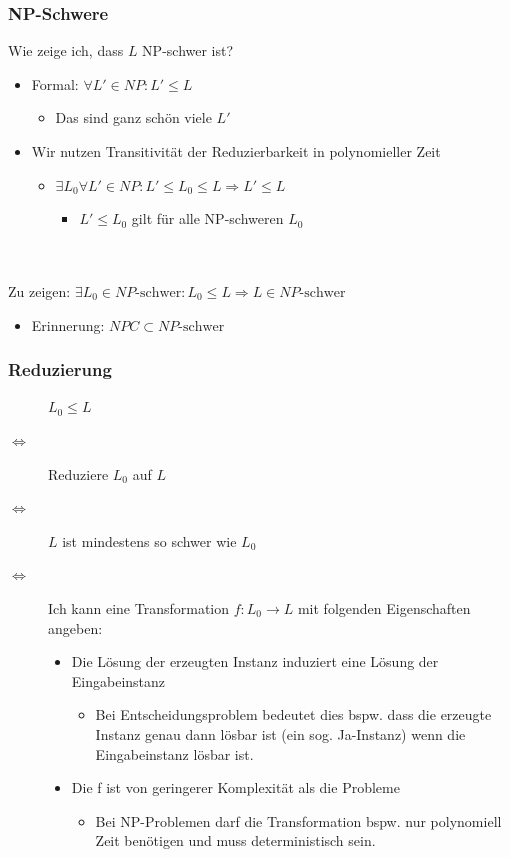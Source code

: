 \begin{frame}
	\frametitle{NP-Schwere}
	Wie zeige ich, dass $L$ NP-schwer ist?
	\begin{itemize}
		\item Formal: $\forall L' \in NP \colon L' \leq L$
		\begin{itemize}
			\item Das sind ganz schön viele $L'$
		\end{itemize}
		\item Wir nutzen Transitivität der Reduzierbarkeit in polynomieller Zeit
		\begin{itemize}
			\item $\exists L_0 \forall L' \in NP \colon L' \leq L_0 \leq L \Rightarrow L' \leq L$
			\begin{itemize}
				\item $L' \leq L_0$ gilt für alle NP-schweren $L_0$
			\end{itemize}
		\end{itemize}
	\end{itemize}~\\~\\
	Zu zeigen: $\exists L_0 \in NP\text{-schwer} \colon L_0 \leq L \Rightarrow L \in NP\text{-schwer}$
	\begin{itemize}
		\item Erinnerung: $NPC \subset NP\text{-schwer}$
	\end{itemize}
\end{frame}
\begin{frame}
\frametitle{Reduzierung}

\begin{description}
	\item[] $L_0 \leq L$
	\item[$\Leftrightarrow$] Reduziere $L_0$ auf $L$
	\item[$\Leftrightarrow$] $L$ ist mindestens so schwer wie $L_0$
	\item[$\Leftrightarrow$] Ich kann eine Transformation $f \colon L_0 \rightarrow L$ mit folgenden Eigenschaften angeben:
	\begin{itemize}
		\item Die Lösung der erzeugten Instanz induziert eine Lösung der Eingabeinstanz
		\begin{itemize}
			\item Bei Entscheidungsproblem bedeutet dies bspw. dass die erzeugte Instanz genau dann lösbar ist (ein sog. \glqq Ja-Instanz\grqq) wenn die Eingabeinstanz lösbar ist.
		\end{itemize}
		\item Die f ist von geringerer Komplexität als die Probleme
		\begin{itemize}
			\item Bei NP-Problemen darf die Transformation bspw. nur polynomiell Zeit benötigen und muss deterministisch sein.
		\end{itemize}
	\end{itemize}
\end{description}
\end{frame}

